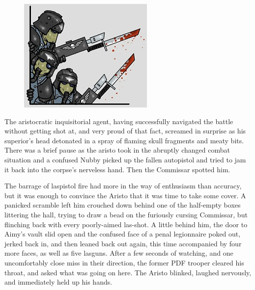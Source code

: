 \begin{figure}
	\begin{center}
		\includegraphics[width=\figwidth]{pics/21/97.png}
	\end{center}
\end{figure}
The aristocratic inquisitorial agent, having successfully navigated the battle without getting shot at, and very proud of that fact, screamed in surprise as his superior's head detonated in a spray of flaming skull fragments and meaty bits. 
There was a brief pause as the aristo took in the abruptly changed combat situation and a confused Nubby picked up the fallen autopistol and tried to jam it back into the corpse's nerveless hand. 
Then the Commissar spotted him.

The barrage of laspistol fire had more in the way of enthusiasm than accuracy, but it was enough to convince the Aristo that it was time to take some cover. 
A panicked scramble left him crouched down behind one of the half-empty boxes littering the hall, trying to draw a bead on the furiously cursing Commissar, but flinching back with every poorly-aimed las-shot. 
A little behind him, the door to Aimy's vault slid open and the confused face of a penal legionnaire poked out, jerked back in, and then leaned back out again, this time accompanied by four more faces, as well as five lasguns. 
After a few seconds of watching, and one uncomfortably close miss in their direction, the former PDF trooper cleared his throat, and asked what was going on here. 
The Aristo blinked, laughed nervously, and immediately held up his hands.

